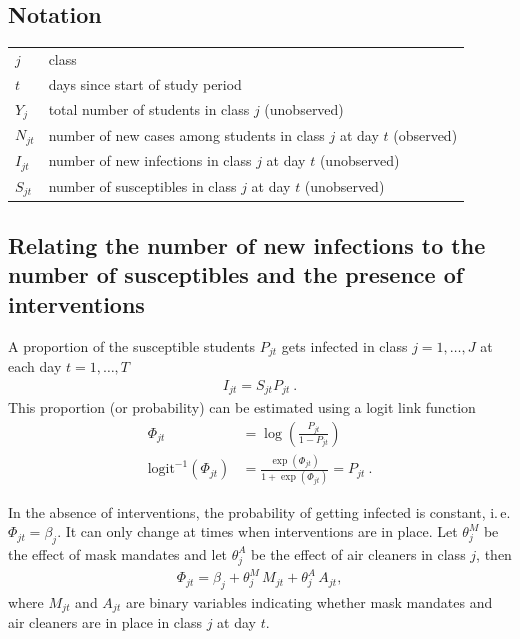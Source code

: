 \documentclass[fleqn,11pt]{wlscirep_supp}
\newcommand\ie{i.\,e.\xspace}
\begin{document}
\subsection{Notation}

\begin{tabular}{ll} 
$j$  & class \\
$t$ & days since start of study period \\
$Y_{j}$  & total number of students in class $j$ (unobserved)  \\
$N_{jt}$  & number of  new cases among students in class $j$ at day $t$ (observed) \\
$I_{jt}$  & number of new infections in class $j$ at day $t$ (unobserved)  \\
$S_{jt}$  & number of susceptibles in class $j$ at day $t$ (unobserved)  \\
\end{tabular}  


\subsection{Relating the number of new infections to the number of susceptibles and the presence of interventions}

A proportion of the susceptible students $P_{jt}$ gets infected in class $j = 1,\dots,J$ at each day $t = 1,\dots,T$
\begin{align}
    I_{jt} = S_{jt} P_{jt} ~.
\end{align}
This proportion (or probability) can be estimated using a logit link function
\begin{align}
    \Phi_{jt} &= \log\left(\frac{P_{jt}}{1-P_{jt}}\right) \\
    \textrm{logit}^{-1}(\Phi_{jt}) &= \frac{\exp{(\Phi_{jt})}}{1 + \exp{(\Phi_{jt})}} = P_{jt} ~.
\end{align}

In the absence of interventions, the probability of getting infected is constant, \ie $\Phi_{jt} = \beta_j$. It can only change at times when interventions are in place. Let $\theta_{j}^M$ be the effect of mask mandates and let $\theta_{j}^A$ be the effect of air cleaners in class $j$, then
\begin{align}
    \Phi_{jt} = \beta_j + \theta_{j}^M\,{M}_{jt}
    + \theta_{j}^A\,{A}_{jt},
\end{align}
where ${M}_{jt}$ and ${A}_{jt}$ are binary variables indicating whether mask mandates and air cleaners are in place in class $j$ at day $t$.
\end{document}

